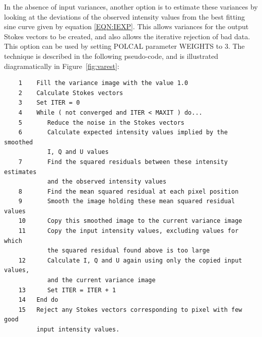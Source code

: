 \documentclass[twoside,11pt]{article}
\newcommand{\latex}[1]{#1}
\newcommand{\html}[1]{}
\renewcommand{\_}{\texttt{\symbol{95}}}
\begin{document}
In the absence of input variances, another option is to estimate these
variances by looking at the deviations of the observed intensity values
from the best fitting sine curve given by equation \ref{EQN:IEXP}. This
allows variances for the output Stokes vectors to be created, and also
allows the iterative rejection of bad data. This option can be used by
setting POLCAL parameter WEIGHTS to 3. The technique is described in the
following pseudo-code, and is illustrated diagramatically in 
\latex{Figure~\ref{fig:varest}:} \html{the next figure:}

\begin{verbatim}
    1    Fill the variance image with the value 1.0
    2    Calculate Stokes vectors
    3    Set ITER = 0
    4    While ( not converged and ITER < MAXIT ) do...
    5       Reduce the noise in the Stokes vectors
    6       Calculate expected intensity values implied by the smoothed 
            I, Q and U values
    7       Find the squared residuals between these intensity estimates
            and the observed intensity values
    8       Find the mean squared residual at each pixel position
    9       Smooth the image holding these mean squared residual values
    10      Copy this smoothed image to the current variance image
    11      Copy the input intensity values, excluding values for which 
            the squared residual found above is too large
    12      Calculate I, Q and U again using only the copied input values, 
            and the current variance image
    13      Set ITER = ITER + 1
    14   End do
    15   Reject any Stokes vectors corresponding to pixel with few good
         input intensity values.
\end{verbatim}
\end{document}
